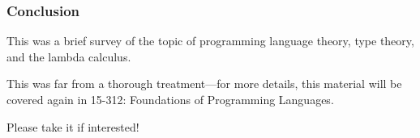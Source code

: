 \documentclass[aspectratio=169, handout]{beamer}
\begin{document}
\begin{frame}[fragile]
  \frametitle{Conclusion}

  This was a brief survey of the topic of programming language theory,
  type theory, and the lambda calculus.

  \pause
  \vspace{\fill}

  This was far from a thorough treatment---for more details, this
  material will be covered again in 15-312: Foundations of
  Programming Languages.

  \pause
  \vspace{\fill}

  Please take it if interested!
\end{frame}















\end{document}
